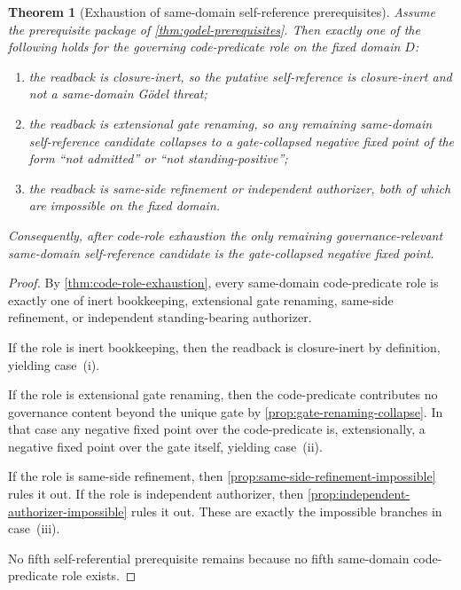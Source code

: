 \documentclass[11pt]{article}
\theoremstyle{plain}
\newtheorem{theorem}{Theorem}[section]
\theoremstyle{definition}
\newcommand{\domain}{D}
\begin{document}
\begin{theorem}[Exhaustion of same-domain self-reference prerequisites]
\label{thm:self-reference-prereqs}
Assume the prerequisite package of \cref{thm:godel-prerequisites}. Then exactly one of the following holds for the governing code-predicate role on the fixed domain $\domain$:
\begin{enumerate}[label=(\roman*), leftmargin=2.5em]
    \item the readback is closure-inert, so the putative self-reference is closure-inert and not a same-domain G\"odel threat;
    \item the readback is extensional gate renaming, so any remaining same-domain self-reference candidate collapses to a gate-collapsed negative fixed point of the form ``not admitted'' or ``not standing-positive'';
    \item the readback is same-side refinement or independent authorizer, both of which are impossible on the fixed domain.
\end{enumerate}
Consequently, after code-role exhaustion the only remaining governance-relevant same-domain self-reference candidate is the gate-collapsed negative fixed point.
\end{theorem}

\begin{proof}
By \cref{thm:code-role-exhaustion}, every same-domain code-predicate role is exactly one of inert bookkeeping, extensional gate renaming, same-side refinement, or independent standing-bearing authorizer.

If the role is inert bookkeeping, then the readback is closure-inert by definition, yielding case~(i).

If the role is extensional gate renaming, then the code-predicate contributes no governance content beyond the unique gate by \cref{prop:gate-renaming-collapse}. In that case any negative fixed point over the code-predicate is, extensionally, a negative fixed point over the gate itself, yielding case~(ii).

If the role is same-side refinement, then \cref{prop:same-side-refinement-impossible} rules it out. If the role is independent authorizer, then \cref{prop:independent-authorizer-impossible} rules it out. These are exactly the impossible branches in case~(iii).

No fifth self-referential prerequisite remains because no fifth same-domain code-predicate role exists.
\end{proof}
\end{document}
